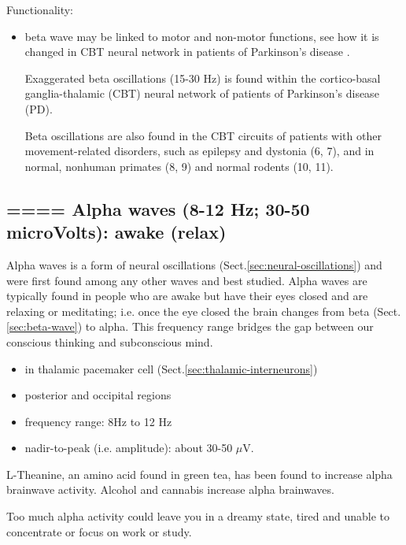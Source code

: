 Functionality:
\begin{itemize}
  \item beta wave may be linked to motor and non-motor functions, 
  see how it is changed in CBT neural network in patients of Parkinson's
  disease \citep{kondabolu2016}.
  
Exaggerated beta oscillations (15-30 Hz) is found within the cortico-basal
ganglia-thalamic (CBT) neural network of patients of Parkinson's disease (PD).

Beta oscillations are also found in the CBT circuits of patients with other
movement-related disorders, such as epilepsy and dystonia (6, 7), and in normal,
nonhuman primates (8, 9) and normal rodents (10, 11).
  
\end{itemize}


\subsection{====  Alpha waves (8-12 Hz; 30-50 microVolts): awake (relax)}
\label{sec:alpha-waves}

Alpha waves is a form of neural oscillations
(Sect.\ref{sec:neural-oscillations}) and were first found among any other waves
and best studied. Alpha waves are typically found in people who are awake but
have their eyes closed and are relaxing or meditating; i.e. once the eye closed
the brain changes from beta (Sect.\ref{sec:beta-wave}) to alpha.
This frequency range bridges the gap between our conscious thinking and
subconscious mind.

\begin{itemize}
  
  \item in thalamic pacemaker cell (Sect.\ref{sec:thalamic-interneurons})
  
  \item posterior and occipital regions
  
  
  \item frequency range: 8Hz to 12 Hz
  
  \item nadir-to-peak (i.e. amplitude): about 30-50 $\mu$V.
\end{itemize}



L-Theanine, an amino acid found in green tea, has been found to increase alpha
brainwave activity. Alcohol and cannabis increase alpha brainwaves.


Too much alpha activity could leave you in a dreamy state, tired and unable to
concentrate or focus on work or study.


